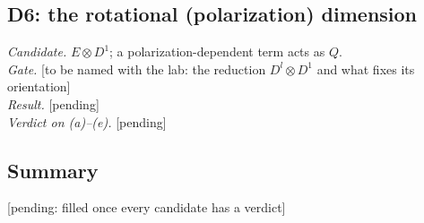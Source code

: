\subsection{D6: the rotational (polarization) dimension}\label{sec:D6}
\emph{Candidate.} $E\otimes D^1$; a polarization-dependent term acts as $Q$.\\
\emph{Gate.} [to be named with the lab: the reduction $D^l\otimes D^1$ and what fixes its
orientation]\\
\emph{Result.} [pending]\\
\emph{Verdict on (a)--(e).} [pending]

\subsection{Summary}\label{sec:constructive-summary}
[pending: filled once every candidate has a verdict]
